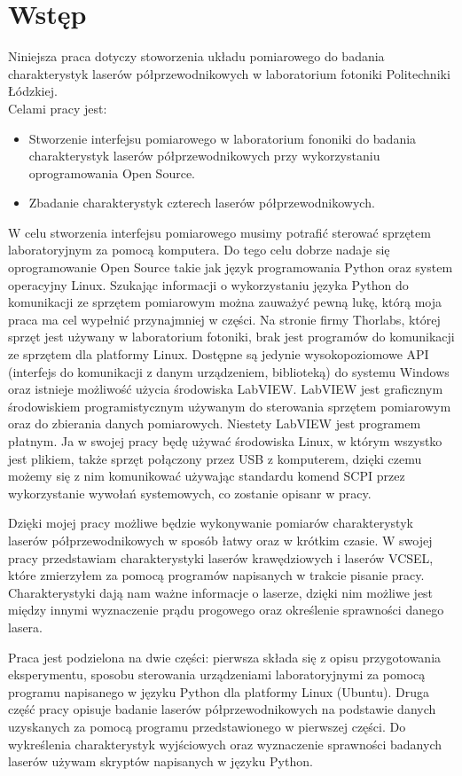 \chapter{Wstęp} \label{rozdz.wstep}
Niniejsza praca dotyczy stoworzenia układu pomiarowego do badania charakterystyk laserów półprzewodnikowych w laboratorium fotoniki
 Politechniki Łódzkiej.\\
Celami pracy jest:
\begin{itemize}
\item Stworzenie interfejsu pomiarowego w laboratorium fononiki do badania charakterystyk laserów półprzewodnikowych przy wykorzystaniu oprogramowania
Open Source.
\item Zbadanie charakterystyk czterech laserów półprzewodnikowych.
\end{itemize}
W celu stworzenia interfejsu pomiarowego musimy potrafić sterować sprzętem laboratoryjnym za pomocą komputera.
Do tego celu dobrze nadaje się oprogramowanie
Open Source takie jak język programowania Python oraz system operacyjny Linux.
Szukając informacji o wykorzystaniu języka Python do komunikacji ze sprzętem pomiarowym można zauważyć pewną lukę,
którą moja praca ma cel wypełnić przynajmniej w części.
Na stronie firmy Thorlabs, której sprzęt jest używany w laboratorium fotoniki,
brak jest programów do komunikacji ze sprzętem dla platformy Linux.
Dostępne są jedynie wysokopoziomowe API (interfejs do komunikacji z danym urządzeniem, biblioteką) do systemu Windows
 oraz istnieje możliwość użycia środowiska LabVIEW.
LabVIEW jest graficznym środowiskiem programistycznym używanym do sterowania sprzętem pomiarowym
oraz do zbierania danych pomiarowych. Niestety LabVIEW jest programem płatnym. Ja w swojej pracy będę używać środowiska Linux,
w którym wszystko jest plikiem, także sprzęt połączony przez USB z komputerem, dzięki czemu możemy się z nim komunikować
używając standardu komend SCPI przez wykorzystanie wywołań systemowych, co zostanie opisanr w pracy.

Dzięki mojej pracy możliwe będzie wykonywanie pomiarów charakterystyk laserów półprzewodnikowych w sposób łatwy oraz w
krótkim czasie.
W swojej pracy przedstawiam charakterystyki laserów krawędziowych i laserów VCSEL, które zmierzyłem za pomocą programów napisanych
w trakcie pisanie pracy.
Charakterystyki dają nam ważne informacje o laserze, dzięki nim możliwe jest między innymi wyznaczenie prądu progowego oraz
określenie sprawności danego lasera.

Praca jest podzielona na dwie części: pierwsza składa się z opisu przygotowania eksperymentu, sposobu sterowania urządzeniami laboratoryjnymi
za pomocą programu napisanego w języku Python dla platformy Linux (Ubuntu).
Druga część pracy opisuje badanie laserów półprzewodnikowych na podstawie danych uzyskanych
za pomocą programu przedstawionego w pierwszej części. Do wykreślenia charakterystyk wyjściowych oraz wyznaczenie sprawności
badanych laserów używam skryptów napisanych w języku Python.